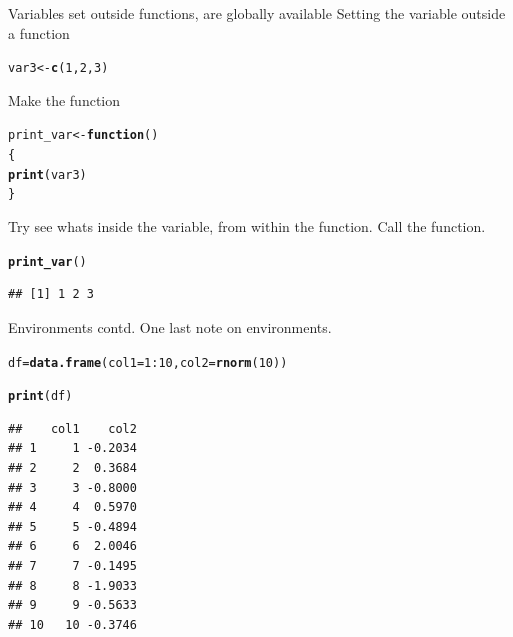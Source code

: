 \documentclass{beamer}\usepackage[]{graphicx}\usepackage[]{color}
\makeatletter
\newcommand{\hlnum}[1]{\textcolor[rgb]{0.686,0.059,0.569}{#1}}%
\newcommand{\hlopt}[1]{\textcolor[rgb]{0,0,0}{#1}}%
\newcommand{\hlstd}[1]{\textcolor[rgb]{0.345,0.345,0.345}{#1}}%
\newcommand{\hlkwa}[1]{\textcolor[rgb]{0.161,0.373,0.58}{\textbf{#1}}}%
\newcommand{\hlkwb}[1]{\textcolor[rgb]{0.69,0.353,0.396}{#1}}%
\newcommand{\hlkwc}[1]{\textcolor[rgb]{0.333,0.667,0.333}{#1}}%
\newcommand{\hlkwd}[1]{\textcolor[rgb]{0.737,0.353,0.396}{\textbf{#1}}}%
\newenvironment{kframe}{%
 \def\at@end@of@kframe{}%
 \ifinner\ifhmode%
  \def\at@end@of@kframe{\end{minipage}}%
  \begin{minipage}{\columnwidth}%
 \fi\fi%
 \def\FrameCommand##1{\hskip\@totalleftmargin \hskip-\fboxsep
 \colorbox{shadecolor}{##1}\hskip-\fboxsep
     \hskip-\linewidth \hskip-\@totalleftmargin \hskip\columnwidth}%
 \MakeFramed {\advance\hsize-\width
   \@totalleftmargin\z@ \linewidth\hsize
   \@setminipage}}%
 {\par\unskip\endMakeFramed%
 \at@end@of@kframe}
\newenvironment{knitrout}{}{} %
\makeatother
\begin{document}
\begin{frame}[fragile]{Variables set outside functions, are globally available}
Setting the variable outside a function
\begin{knitrout}
\color{fgcolor}\begin{kframe}
\begin{alltt}
\hlstd{var3} \hlkwb{<-} \hlkwd{c}\hlstd{(}\hlnum{1}\hlstd{,}\hlnum{2}\hlstd{,}\hlnum{3}\hlstd{)}
\end{alltt}
\end{kframe}
\end{knitrout}
Make the function
\begin{knitrout}
\color{fgcolor}\begin{kframe}
\begin{alltt}
\hlstd{print_var} \hlkwb{<-} \hlkwa{function} \hlstd{()}
\hlstd{\{}
    \hlkwd{print}\hlstd{(var3)}
\hlstd{\}}
\end{alltt}
\end{kframe}
\end{knitrout}
Try see whats inside the variable, from within the function.
\linebreak
Call the function.
\begin{knitrout}
\color{fgcolor}\begin{kframe}
\begin{alltt}
\hlkwd{print_var}\hlstd{()}
\end{alltt}
\begin{verbatim}
## [1] 1 2 3
\end{verbatim}
\end{kframe}
\end{knitrout}
\end{frame}


\begin{frame}[fragile]{Environments contd.}
One last note on environments.
\begin{knitrout}
\color{fgcolor}\begin{kframe}
\begin{alltt}
\hlstd{df} \hlkwb{=} \hlkwd{data.frame}\hlstd{(}\hlkwc{col1}\hlstd{=}\hlnum{1}\hlopt{:}\hlnum{10}\hlstd{,} \hlkwc{col2}\hlstd{=}\hlkwd{rnorm}\hlstd{(}\hlnum{10}\hlstd{))}

\hlkwd{print}\hlstd{(df)}
\end{alltt}
\begin{verbatim}
##    col1    col2
## 1     1 -0.2034
## 2     2  0.3684
## 3     3 -0.8000
## 4     4  0.5970
## 5     5 -0.4894
## 6     6  2.0046
## 7     7 -0.1495
## 8     8 -1.9033
## 9     9 -0.5633
## 10   10 -0.3746
\end{verbatim}
\end{kframe}
\end{knitrout}

\end{frame}
\end{document}

